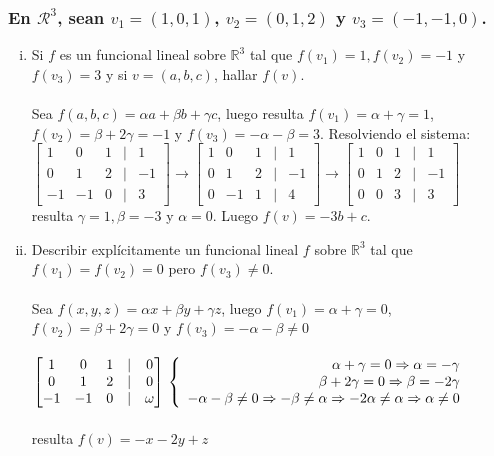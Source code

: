 \documentclass{article}
\begin{document}
\subsubsection{En $\mathcal{R}^3$, sean $v_1=(1,0,1)$, $v_2=(0,1,2)$ y $v_3=(-1,-1,0)$.}
\begin{enumerate}[i.]
\item
	Si $f$ es un funcional lineal sobre $\mathbb{R}^3$ tal que $f(v_1) = 1, f(v_2) = -1$ y $f(v_3) = 3$ y si
	$v=(a,b,c)$, hallar $f(v)$. \\ \\
	Sea $f(a,b,c) = \alpha a + \beta b + \gamma c$, luego resulta $f(v_1) = \alpha + \gamma = 1$,
	$f(v_2) = \beta + 2 \gamma = -1$ y $f(v_3) = -\alpha - \beta= 3$. Resolviendo el sistema:
	$\begin{bmatrix}1&0&1&|&1 \\ 0&1&2&|&-1 \\ -1&-1&0&|&3 \end{bmatrix} \rightarrow
	\begin{bmatrix}1&0&1&|&1 \\ 0&1&2&|&-1 \\ 0&-1&1&|&4 \end{bmatrix} \rightarrow
	\begin{bmatrix}1&0&1&|&1 \\ 0&1&2&|&-1 \\ 0&0&3&|&3 \end{bmatrix}$ \\
	resulta $\gamma = 1, \beta = -3$ y $\alpha = 0$. Luego $f(v) = -3b + c$.

\item 
	Describir explícitamente un funcional lineal $f$ sobre $\mathbb{R}^3$ tal que $f(v_1)=f(v_2)=0$ pero
	$f(v_3) \not = 0$. \\ \\
	Sea $f(x,y,z) = \alpha x + \beta y + \gamma z$, luego $f(v_1) = \alpha + \gamma = 0$,
	$f(v_2) = \beta + 2 \gamma = 0$ y $f(v_3) = -\alpha - \beta \not = 0$ \\ \\
        $\begin{bmatrix} 1&0&1&|&0 \\ 0&1&2&|&0 \\ -1&-1&0&|&\omega \end{bmatrix} \\  \\
	\left \lbrace
	\begin{array}{rlc}
	\alpha + \gamma = 0 \Rightarrow \alpha = - \gamma \\
	\beta + 2 \gamma = 0 \Rightarrow  \beta = -2\gamma \\
	- \alpha - \beta \not = 0 \Rightarrow  -\beta \not = \alpha \Rightarrow -2\alpha \not = \alpha \Rightarrow \alpha \not = 0
	\end{array}
	\right.
	$ \\ \\
	resulta $f(v) = -x-2y+z$	
	

\end{enumerate}
\end{document}
